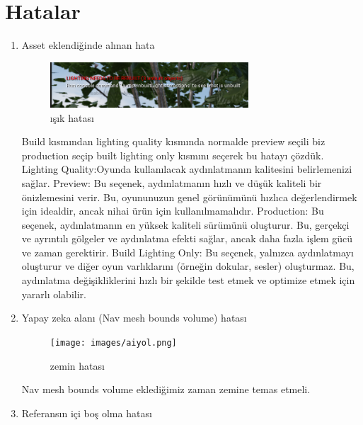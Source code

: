 \documentclass[12pt,a4paper]{article}
\begin{document}
	\section{Hatalar \newline} 
	
	   
	\begin{enumerate}
		\item Asset eklendiğinde alınan hata
			\begin{center}
			\begin{figure}[!htbp]
				\includegraphics[width=0.7\textwidth,center]{images/ısıkhatasi.png}
				\caption{ışık hatası}
				\label{fig:ornek}
			\end{figure}
		\end{center}
		
		Build kısmından lighting quality kısmında normalde preview seçili biz production seçip  built lighting  only kısmını seçerek bu hatayı çözdük.\newline
		Lighting Quality:Oyunda kullanılacak aydınlatmanın kalitesini belirlemenizi sağlar.\newline
		Preview: Bu seçenek, aydınlatmanın hızlı ve düşük kaliteli bir önizlemesini verir. Bu, oyununuzun genel görünümünü hızlıca değerlendirmek için idealdir, ancak nihai ürün için kullanılmamalıdır.\newline
		Production: Bu seçenek, aydınlatmanın en yüksek kaliteli sürümünü oluşturur. Bu, gerçekçi ve ayrıntılı gölgeler ve aydınlatma efekti sağlar, ancak daha fazla işlem gücü ve zaman gerektirir.\newline
		Build Lighting Only: Bu seçenek, yalnızca aydınlatmayı oluşturur ve diğer oyun varlıklarını (örneğin dokular, sesler) oluşturmaz. Bu, aydınlatma değişikliklerini hızlı bir şekilde test etmek ve optimize etmek için yararlı olabilir.\vspace{0.5cm}
		\item Yapay zeka alanı (Nav mesh bounds volume) hatası
			
			\begin{figure}[!htbp]
				\texttt{[image: images/aiyol.png]}
				\caption{zemin hatası}
				\label{fig:ornek}
			\end{figure}

		Nav mesh bounds volume eklediğimiz zaman zemine temas etmeli.
		\item Referansın içi boş olma hatası
	

\end{enumerate}
\end{document}
